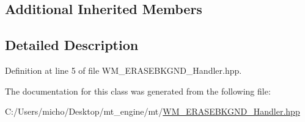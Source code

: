 \subsection*{Additional Inherited Members}


\subsection{Detailed Description}


Definition at line 5 of file W\+M\+\_\+\+E\+R\+A\+S\+E\+B\+K\+G\+N\+D\+\_\+\+Handler.\+hpp.



The documentation for this class was generated from the following file\+:\begin{DoxyCompactItemize}
\item 
C\+:/\+Users/micho/\+Desktop/mt\+\_\+engine/mt/\hyperlink{_w_m___e_r_a_s_e_b_k_g_n_d___handler_8hpp}{W\+M\+\_\+\+E\+R\+A\+S\+E\+B\+K\+G\+N\+D\+\_\+\+Handler.\+hpp}\end{DoxyCompactItemize}
